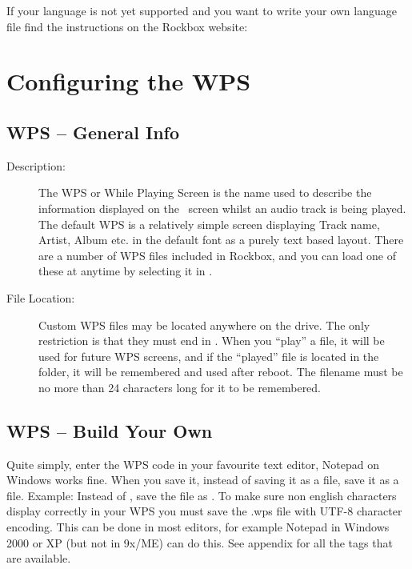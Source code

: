 If your language is not yet supported and you want to write your own language
file find the instructions on the Rockbox website:

\section{\label{ref:ConfiguringtheWPS}Configuring the WPS}

\subsection{WPS -- General Info}

\begin{description}
\item[Description: ] The WPS or While Playing Screen is the name used to 
  describe the information displayed on the \daps\ screen whilst an audio track
  is being played. The default WPS is a relatively simple screen displaying
  Track name, Artist, Album etc. in the default font as a purely text based
  layout. There are a number of WPS files included in Rockbox, and you can 
  load one of these at anytime by selecting it in
  .



\item [File Location: ]Custom WPS files may be located anywhere on the drive. 
  The only restriction is that they must end in . When you ``play''
  a  file, it will be used for future WPS screens, and if the 
  ``played''  file is located in the  folder, it 
  will be remembered and used after reboot. The  filename must be 
  no more than 24 characters long for it to be remembered.
\end{description}

\subsection{\label{ref:CreateYourOwnWPS}WPS -- Build Your Own}
Quite simply, enter the WPS code in your favourite text editor, Notepad on
Windows works fine. When you save it, instead of saving it as a  
file, save it as a  file. Example: Instead of , 
save the file as . To make sure non english characters 
display correctly in your WPS you must save the .wps file with UTF-8 character 
encoding. This can be done in most editors, for example Notepad in Windows 2000
or XP (but not in 9x/ME) can do this. See appendix  for
all the tags that are available.

